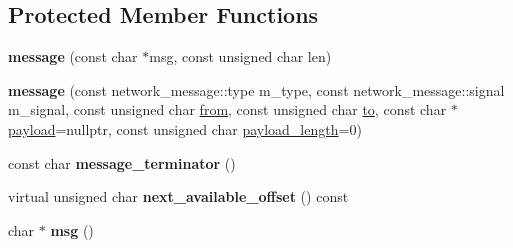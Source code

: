 \subsection*{Protected Member Functions}
\begin{DoxyCompactItemize}
\item 
\mbox{\label{classbattleship_1_1network__message_1_1message_a8648ab9741e0a2617e79a2a33b816597}} 
{\bfseries message} (const char $\ast$msg, const unsigned char len)
\item 
\mbox{\label{classbattleship_1_1network__message_1_1message_a4cc5125a5a6f24e1bc31db2b9457d0f9}} 
{\bfseries message} (const network\+\_\+message\+::type m\+\_\+type, const network\+\_\+message\+::signal m\+\_\+signal, const unsigned char \hyperlink{classbattleship_1_1network__message_1_1message_af2ebed25f82de46c947a2241c6952563}{from}, const unsigned char \hyperlink{classbattleship_1_1network__message_1_1message_a36145cf7dfc9102da280adfad5d1a972}{to}, const char $\ast$\hyperlink{classbattleship_1_1network__message_1_1message_ab42ddf52012135284f65641702459912}{payload}=nullptr, const unsigned char \hyperlink{classbattleship_1_1network__message_1_1message_ac4a236888d40ffbdd8572660a3f34b1e}{payload\+\_\+length}=0)
\item 
\mbox{\label{classbattleship_1_1network__message_1_1message_a8e025f494428c0e498341dcac119155e}} 
const char {\bfseries message\+\_\+terminator} ()
\item 
\mbox{\label{classbattleship_1_1network__message_1_1message_ac410b96d54dffc60f16c459b7d4ecc94}} 
virtual unsigned char {\bfseries next\+\_\+available\+\_\+offset} () const
\item 
\mbox{\label{classbattleship_1_1network__message_1_1message_a390532050b2c6e513a3b3aa666878f37}} 
char $\ast$ {\bfseries msg} ()
\end{DoxyCompactItemize}
